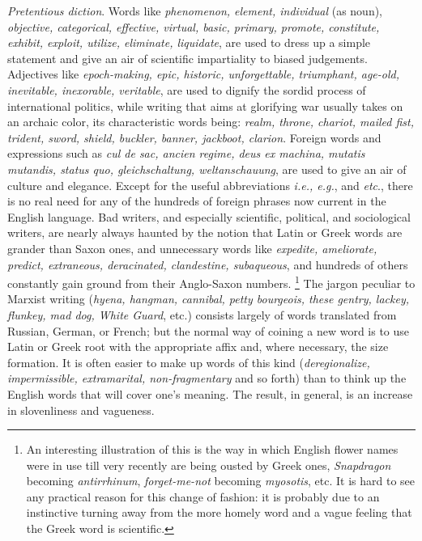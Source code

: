 \documentclass[article,twoside,a4paper]{memoir}
\begin{document}
\emph{Pretentious diction}. Words like \emph{phenomenon, element, individual }(as
noun), \emph{objective, categorical, effective, virtual, basic, primary, promote,
  constitute, exhibit, exploit, utilize, eliminate, liquidate}, are used to
dress up a simple statement and give an air of scientific impartiality to biased
judgements. Adjectives like \emph{epoch-making, epic, historic, unforgettable,
  triumphant, age-old, inevitable, inexorable, veritable}, are used to dignify
the sordid process of international politics, while writing that aims at glorifying
war usually takes on an archaic color, its characteristic words being: \emph{realm,
  throne, chariot, mailed fist, trident, sword, shield, buckler, banner, jackboot,
clarion}. Foreign words and expressions such as \emph{cul de sac, ancien regime,
  deus ex machina, mutatis mutandis, status quo, gleichschaltung, weltanschauung},
are used to give an air of culture and elegance. Except for the useful abbreviations
\emph{i.e., e.g.}, and \emph{etc}., there is no real need for any of the hundreds
of foreign phrases now current in the English language. Bad writers, and especially
scientific, political, and sociological writers, are nearly always haunted by
the notion that Latin or Greek words are grander than Saxon ones, and unnecessary
words like \emph{expedite, ameliorate, predict, extraneous, deracinated, clandestine,
  subaqueous}, and hundreds of others constantly gain ground from their Anglo-Saxon
numbers.%
\footnote{An interesting illustration of this is the way in which English flower names
were in use till very recently are being ousted by Greek ones, \emph{Snapdragon}
becoming \emph{antirrhinum}, \emph{forget-me-not} becoming \emph{myosotis},
etc. It is hard to see any practical reason for this change of fashion: it is
probably due to an instinctive turning away from the more homely word and a
vague feeling that the Greek word is scientific.}
The jargon peculiar to Marxist writing (\emph{hyena, hangman, cannibal,
  petty bourgeois, these gentry,
  lackey, flunkey, mad dog, White Guard}, etc.) consists largely of words translated
from Russian, German, or French; but the normal way of coining a new word is
to use Latin or Greek root with the appropriate affix and, where necessary,
the size formation. It is often easier to make up words of this kind (\emph{deregionalize,
  impermissible, extramarital, non-fragmentary} and so forth) than to think
up the English words that will cover one's meaning. The result, in general,
is an increase in slovenliness and vagueness.
\end{document}
